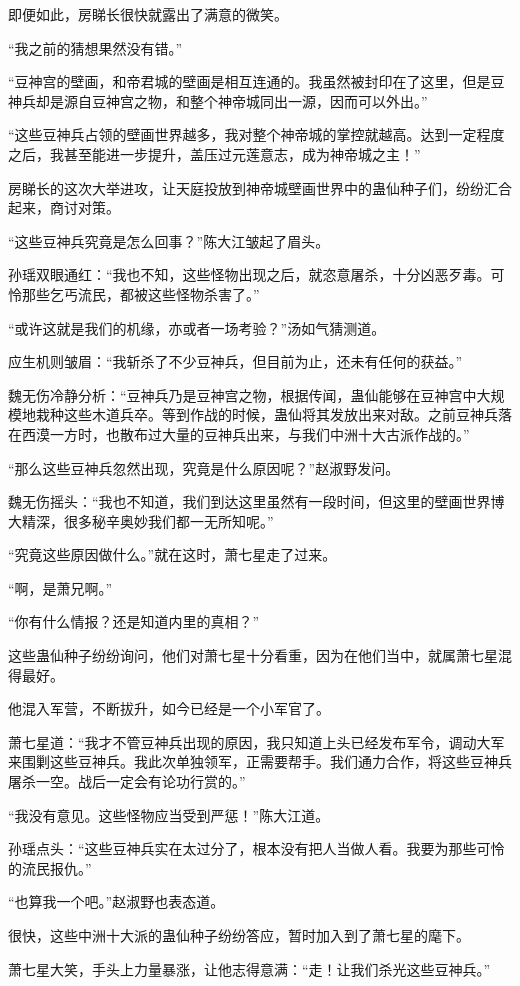 \begin{this_body}
即便如此，房睇长很快就露出了满意的微笑。

“我之前的猜想果然没有错。”

“豆神宫的壁画，和帝君城的壁画是相互连通的。我虽然被封印在了这里，但是豆神兵却是源自豆神宫之物，和整个神帝城同出一源，因而可以外出。”

“这些豆神兵占领的壁画世界越多，我对整个神帝城的掌控就越高。达到一定程度之后，我甚至能进一步提升，盖压过元莲意志，成为神帝城之主！”

房睇长的这次大举进攻，让天庭投放到神帝城壁画世界中的蛊仙种子们，纷纷汇合起来，商讨对策。

“这些豆神兵究竟是怎么回事？”陈大江皱起了眉头。

孙瑶双眼通红：“我也不知，这些怪物出现之后，就恣意屠杀，十分凶恶歹毒。可怜那些乞丐流民，都被这些怪物杀害了。”

“或许这就是我们的机缘，亦或者一场考验？”汤如气猜测道。

应生机则皱眉：“我斩杀了不少豆神兵，但目前为止，还未有任何的获益。”

魏无伤冷静分析：“豆神兵乃是豆神宫之物，根据传闻，蛊仙能够在豆神宫中大规模地栽种这些木道兵卒。等到作战的时候，蛊仙将其发放出来对敌。之前豆神兵落在西漠一方时，也散布过大量的豆神兵出来，与我们中洲十大古派作战的。”

“那么这些豆神兵忽然出现，究竟是什么原因呢？”赵淑野发问。

魏无伤摇头：“我也不知道，我们到达这里虽然有一段时间，但这里的壁画世界博大精深，很多秘辛奥妙我们都一无所知呢。”

“究竟这些原因做什么。”就在这时，萧七星走了过来。

“啊，是萧兄啊。”

“你有什么情报？还是知道内里的真相？”

这些蛊仙种子纷纷询问，他们对萧七星十分看重，因为在他们当中，就属萧七星混得最好。

他混入军营，不断拔升，如今已经是一个小军官了。

萧七星道：“我才不管豆神兵出现的原因，我只知道上头已经发布军令，调动大军来围剿这些豆神兵。我此次单独领军，正需要帮手。我们通力合作，将这些豆神兵屠杀一空。战后一定会有论功行赏的。”

“我没有意见。这些怪物应当受到严惩！”陈大江道。

孙瑶点头：“这些豆神兵实在太过分了，根本没有把人当做人看。我要为那些可怜的流民报仇。”

“也算我一个吧。”赵淑野也表态道。

很快，这些中洲十大派的蛊仙种子纷纷答应，暂时加入到了萧七星的麾下。

萧七星大笑，手头上力量暴涨，让他志得意满：“走！让我们杀光这些豆神兵。”

\end{this_body}

